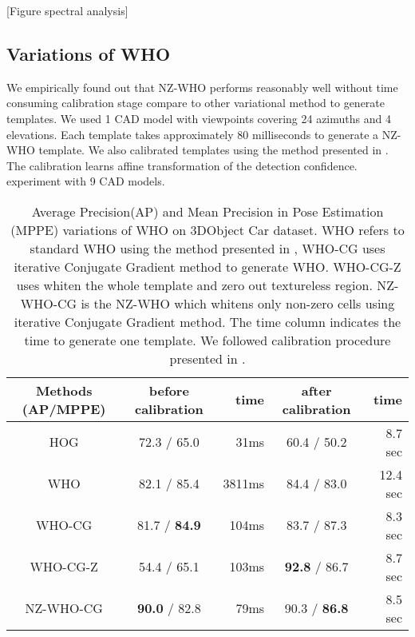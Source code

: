 [Figure spectral analysis]

\subsection{Variations of WHO}
We empirically found out that NZ-WHO performs reasonably well without time
consuming calibration stage compare to other variational method to generate
templates. We used 1 CAD model with viewpoints covering 24 azimuths and 4
elevations. Each template takes approximately 80 milliseconds to generate a
NZ-WHO template. We also calibrated templates using the method presented in
\cite{Aubry14}. The calibration learns affine transformation of the detection
confidence.%
experiment with 9 CAD models.


\begin{table*}[!htbp]
    \footnotesize
    \begin{center}
\begin{tabular}{|c|c|r|c|r|}
\hline
Methods (AP/MPPE) & before calibration  & time & after calibration \cite{Aubry14} & time \\
\hline\hline
HOG\cite{Dalal05}     & 72.3 / 65.0           &  31ms  & 60.4 / 50.2                 & 8.7 sec \\ 
WHO\cite{Hariharan12} & 82.1 / 85.4           &  3811ms& 84.4 / 83.0                 & 12.4 sec  \\
WHO-CG                & 81.7 / \textbf{84.9}  &  104ms & 83.7 / 87.3                 & 8.3 sec \\
WHO-CG-Z              & 54.4 / 65.1           &  103ms & \textbf{92.8} / 86.7        & 8.7 sec  \\
NZ-WHO-CG             & \textbf{90.0} / 82.8  &   79ms & 90.3 / \textbf{86.8}        & 8.5 sec   \\
\hline
\end{tabular}
\end{center}
\caption{Average Precision(AP) and Mean Precision in Pose Estimation (MPPE) \cite{Lopez-Sastre11} variations of WHO on 3DObject Car dataset\cite{Savarese07}. WHO refers to standard WHO using the method presented in \cite{Hariharan12}, WHO-CG uses iterative Conjugate Gradient method to generate WHO. WHO-CG-Z uses whiten the whole template and zero out textureless region. NZ-WHO-CG is the NZ-WHO which whitens only non-zero cells using iterative Conjugate Gradient method. The time column indicates the time to generate one template. We followed calibration procedure presented in \cite{Aubry14}.}
\label{tab:who_initializations}
\end{table*}

